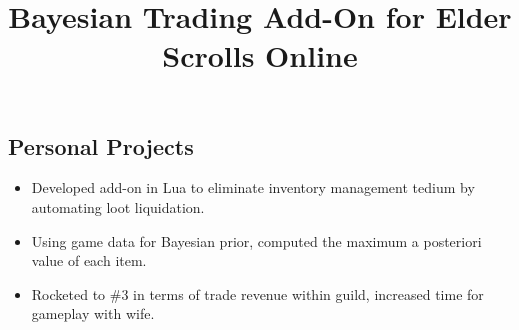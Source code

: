 \documentclass[12pt]{res} %
\begin{document}
\begin{resume}
        \section{Personal Projects}

        \vspace{2pt}


        \employer{}
        \title{\textbf{Bayesian Trading Add-On for Elder Scrolls Online}}
        \dates{}
        \begin{position}
          \vspace{-28pt}
          \begin{itemize}[leftmargin=-0.4cm, rightmargin=0.8cm]
          \itemsep0em
          \item Developed add-on in Lua to eliminate inventory management tedium by automating loot liquidation.
          \item Using game data for Bayesian prior, computed the maximum a posteriori value of each item.
          \item Rocketed to \#3 in terms of trade revenue within guild, increased time for gameplay with wife.
          \end{itemize}
        \end{position}
        \vspace{-10pt}


\end{resume}
\end{document}
